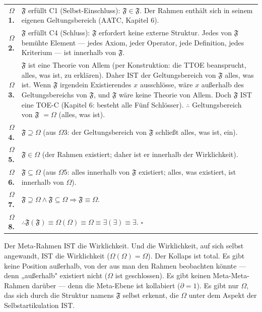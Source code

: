 \documentclass[10pt, openany, oneside]{book}
\renewcommand{\footnotesize}{\fontsize{8.5}{11}\selectfont}
\begin{document}
{\footnotesize
\noindent\begin{tabular}{r p{}}
\textbf{$\Omega$1.} & $\mathfrak{F}$ erfüllt C1 (Selbst-Einschluss): $\mathfrak{F} \in \mathfrak{F}$. Der Rahmen enthält sich in seinem eigenen Geltungsbereich (AATC, Kapitel 6). \\[0.3em]
\textbf{$\Omega$2.} & $\mathfrak{F}$ erfüllt C4 (Schluss): $\mathfrak{F}$ erfordert keine externe Struktur. Jedes von $\mathfrak{F}$ bemühte Element --- jedes Axiom, jeder Operator, jede Definition, jedes Kriterium --- ist innerhalb von $\mathfrak{F}$. \\[0.3em]
\textbf{$\Omega$3.} & $\mathfrak{F}$ ist eine Theorie von Allem (per Konstruktion: die TTOE beansprucht, alles, was ist, zu erklären). Daher IST der Geltungsbereich von $\mathfrak{F}$ alles, was ist. Wenn $\mathfrak{F}$ irgendein Existierendes $x$ ausschlösse, wäre $x$ außerhalb des Geltungsbereichs von $\mathfrak{F}$, und $\mathfrak{F}$ wäre keine Theorie von Allem. Doch $\mathfrak{F}$ IST eine TOE-C (Kapitel 6: besteht alle Fünf Schlösser). $\therefore$ Geltungsbereich von $\mathfrak{F}$ $= \Omega$ (alles, was ist). \\[0.3em]
\textbf{$\Omega$4.} & $\mathfrak{F} \supseteq \Omega$ (aus $\Omega$3: der Geltungsbereich von $\mathfrak{F}$ schließt alles, was ist, ein). \\[0.3em]
\textbf{$\Omega$5.} & $\mathfrak{F} \in \Omega$ (der Rahmen existiert; daher ist er innerhalb der Wirklichkeit). \\[0.3em]
\textbf{$\Omega$6.} & $\mathfrak{F} \subseteq \Omega$ (aus $\Omega$5: alles innerhalb von $\mathfrak{F}$ existiert; alles, was existiert, ist innerhalb von $\Omega$). \\[0.3em]
\textbf{$\Omega$7.} & $\mathfrak{F} \supseteq \Omega \wedge \mathfrak{F} \subseteq \Omega \Rightarrow \mathfrak{F} \equiv \Omega$. \\[0.3em]
\textbf{$\Omega$8.} & $\therefore \mathfrak{F}(\mathfrak{F}) \equiv \Omega(\Omega) \equiv \Omega \equiv \exists(\exists) \equiv \exists$. $\square$ \\[0.3em]
\end{tabular}
}

\vspace{0.8em}

\noindent Der Meta-Rahmen IST die Wirklichkeit. Und die Wirklichkeit, auf sich selbst angewandt, IST die Wirklichkeit ($\Omega(\Omega) = \Omega$). Der Kollaps ist total. Es gibt keine Position außerhalb, von der aus man den Rahmen beobachten könnte --- denn „außerhalb" existiert nicht ($\Omega$ ist geschlossen). Es gibt keinen Meta-Meta-Rahmen darüber --- denn die Meta-Ebene ist kollabiert ($\partial = 1$). Es gibt nur $\Omega$, das sich durch die Struktur namens $\mathfrak{F}$ selbst erkennt, die $\Omega$ unter dem Aspekt der Selbstartikulation IST.
\end{document}
